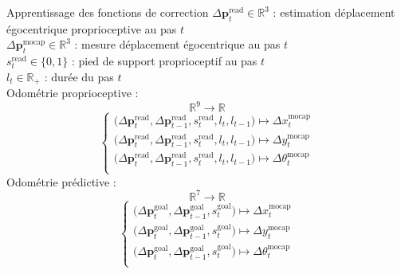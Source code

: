 \begin{frame}{Apprentissage des fonctions de correction}
    $\Delta \bm{p}_{t}^{\text{read}} \in \mathbb{R}^3$ : estimation déplacement égocentrique proprioceptive au pas $t$\\
    $\Delta \bm{p}_{t}^{\text{mocap}} \in \mathbb{R}^3$ : mesure déplacement égocentrique au pas $t$\\
    $s_{t}^{\text{read}} \in \{0, 1\}$ : pied de support proprioceptif au pas $t$\\
    $l_{t} \in \mathbb{R}_{+}$ : durée du pas $t$\\
    \vspace{1em}
    Odométrie proprioceptive :
    $$
    \mathbb{R}^9 \longrightarrow \mathbb{R}
    $$
    $$
    \begin{cases}
    \big(\Delta \bm{p}_{t}^{\text{read}}, \Delta \bm{p}_{t-1}^{\text{read}}, s_{t}^{\text{read}}, l_{t}, l_{t-1}\big) 
    \longmapsto \Delta x_{t}^{\text{mocap}} \\
    \big(\Delta \bm{p}_{t}^{\text{read}}, \Delta \bm{p}_{t-1}^{\text{read}}, s_{t}^{\text{read}}, l_{t}, l_{t-1}\big) 
    \longmapsto \Delta y_{t}^{\text{mocap}} \\
    \big(\Delta \bm{p}_{t}^{\text{read}}, \Delta \bm{p}_{t-1}^{\text{read}}, s_{t}^{\text{read}}, l_{t}, l_{t-1}\big) 
    \longmapsto \Delta \theta_{t}^{\text{mocap}} \\
    \end{cases}
    $$
    Odométrie prédictive :
    $$
    \mathbb{R}^7 \longrightarrow \mathbb{R}
    $$
    $$
    \begin{cases}
    \big(\Delta \bm{p}_{t}^{\text{goal}}, \Delta \bm{p}_{t-1}^{\text{goal}}, s_{t}^{\text{goal}}\big) 
    \longmapsto \Delta x_{t}^{\text{mocap}} \\
    \big(\Delta \bm{p}_{t}^{\text{goal}}, \Delta \bm{p}_{t-1}^{\text{goal}}, s_{t}^{\text{goal}}\big) 
    \longmapsto \Delta y_{t}^{\text{mocap}} \\
    \big(\Delta \bm{p}_{t}^{\text{goal}}, \Delta \bm{p}_{t-1}^{\text{goal}}, s_{t}^{\text{goal}}\big) 
    \longmapsto \Delta \theta_{t}^{\text{mocap}} \\
    \end{cases}
    $$
\end{frame}

